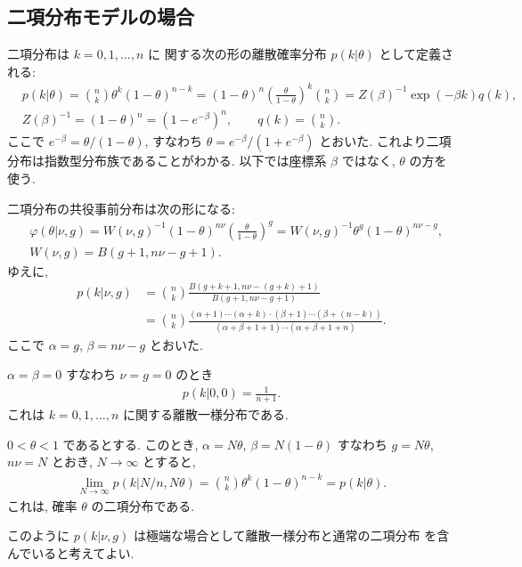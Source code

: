 \documentclass[12pt,twoside]{jarticle}
\theoremstyle{jplain}
\theoremstyle{jplain}
\theoremstyle{jplain}
\numberwithin{theorem}{section}
\numberwithin{equation}{section}
\numberwithin{figure}{section}
\numberwithin{table}{section}
\begin{document}
\subsection{二項分布モデルの場合}

二項分布は $k=0,1,\ldots,n$ に
関する次の形の離散確率分布 $p(k|\theta)$ として定義される:
\begin{align*}
  &
  p(k|\theta) = \binom{n}{k}\theta^k(1-\theta)^{n-k}
  = (1-\theta)^n \left(\frac{\theta}{1-\theta}\right)^k\binom{n}{k}
  = Z(\beta)^{-1}\exp(-\beta k) q(k),
  \\ &
  Z(\beta)^{-1} = (1-\theta)^n = (1-e^{-\beta})^n, \qquad
  q(k) = \binom{n}{k}.
\end{align*}
ここで $e^{-\beta} = \theta/(1-\theta)$,
すなわち $\theta=e^{-\beta}/(1+e^{-\beta})$ とおいた.
これより二項分布は指数型分布族であることがわかる.
以下では座標系 $\beta$ ではなく, $\theta$ の方を使う.

二項分布の共役事前分布は次の形になる:
\begin{align*}
  &
  \varphi(\theta|\nu,g)
  = W(\nu,g)^{-1}(1-\theta)^{n\nu} \left(\frac{\theta}{1-\theta}\right)^g
  = W(\nu,g)^{-1} \theta^g (1-\theta)^{n\nu-g},
  \\ &
  W(\nu, g) = B(g+1, n\nu-g+1).
\end{align*}
ゆえに,
\begin{align*}
  p(k|\nu,g)
  &=\binom{n}{k}\frac{B(g+k+1, n\nu-(g+k)+1)}{B(g+1,n\nu-g+1)}
  \\ &
  =\binom{n}{k}
  \frac
  {(\alpha+1)\cdots(\alpha+k)\cdot(\beta+1)\cdots(\beta+(n-k))}
  {(\alpha+\beta+1+1)\cdots(\alpha+\beta+1+n)}.
\end{align*}
ここで $\alpha=g$, $\beta=n\nu-g$ とおいた.

$\alpha=\beta=0$ すなわち $\nu=g=0$ のとき
\begin{align*}
  p(k|0,0) = \frac{1}{n+1}.
\end{align*}
これは $k=0,1,\ldots,n$ に関する離散一様分布である.

$0<\theta<1$ であるとする.
このとき, $\alpha = N\theta$, $\beta=N(1-\theta)$
すなわち $g = N\theta$, $n\nu=N$ とおき,
$N\to\infty$ とすると,
\begin{align*}
  \lim_{N\to\infty}p(k|N/n, N\theta)
  = \binom{n}{k}\theta^k(1-\theta)^{n-k}
  = p(k|\theta).
\end{align*}
これは, 確率 $\theta$ の二項分布である.

このように $p(k|\nu,g)$ は極端な場合として離散一様分布と通常の二項分布
を含んでいると考えてよい.
\end{document}

